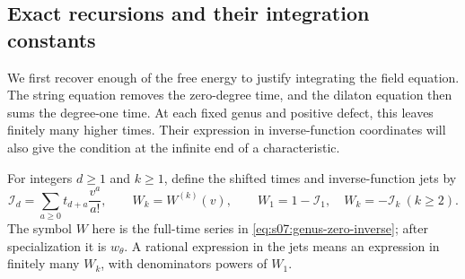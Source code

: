 \subsection{Exact recursions and their integration constants}
\label{subsec:s07:03}

We first recover enough of the free energy to justify integrating the
field equation. The string equation removes the zero-degree time, and
the dilaton equation then sums the degree-one time. At each fixed genus
and positive defect, this leaves finitely many higher times. Their expression in
inverse-function coordinates will also give the condition at the
infinite end of a characteristic.

For integers $d\geq1$ and $k\geq1$, define the shifted times and
inverse-function jets by
\begin{equation}\label{eq:s07:jets}
 \mathcal I_d=\sum_{a\geq0}t_{d+a}\frac{v^a}{a!},\qquad
 W_k=W^{(k)}(v),\qquad
 W_1=1-\mathcal I_1,\quad W_k=-\mathcal I_k\ (k\geq2).
\end{equation}
The symbol $W$ here is the full-time series in
\eqref{eq:s07:genus-zero-inverse}; after specialization it is
$w_\theta$. A rational expression in the jets means an expression in
finitely many $W_k$, with denominators powers of $W_1$.

